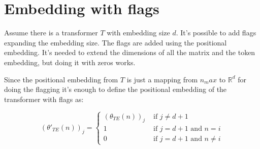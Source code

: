\section*{Embedding with flags}


Assume there is a transformer $T$ with embedding size $d$. It's possible to add flags expanding the embedding size. The flags are added using the positional embedding. It's needed to extend the dimensions of all the matrix and the token embedding, but doing it with zeros works.

Since the positional embedding from $T$ is just a mapping from $n_max$ to $\mathbb{R}^d$ for doing the flagging it's enough to define the positional embedding of the transformer with flags as:

\begin{equation*}
    (\theta'_{TE}(n))_j = \begin{cases}
        (\theta_{TE}(n))_j  & \text{ if } j \neq d+1 \\
        1                   & \text{ if } j = d+1  \text{ and } n = i \\
        0                   & \text{ if } j = d+1  \text{ and } n \neq i
    \end{cases}
\end{equation*}

